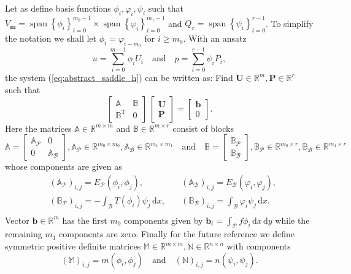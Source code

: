 \documentclass[a4paper,10pt]{article}
\newcommand{\R}{\ensuremath{\mathbb{R}}}
\newcommand{\meas}[1]{\ensuremath{\,\mathrm{d}#1}}
\newcommand{\mm}{\ensuremath{\mathbf{m}}}
\newcommand{\Ep}{\ensuremath{E_{\mathcal{P}}}}
\newcommand{\Eb}{\ensuremath{E_{\mathcal{B}}}}
\newcommand{\Ap}{\ensuremath{\mathbb{A}_{\mathcal{P}}}}
\newcommand{\Ab}{\ensuremath{\mathbb{A}_{\mathcal{B}}}}
\newcommand{\Bp}{\ensuremath{\mathbb{B}_{\mathcal{P}}}}
\newcommand{\Bb}{\ensuremath{\mathbb{B}_{\mathcal{B}}}}
\newcommand{\Amat}{\ensuremath{\mathbb{A}}}
\newcommand{\Bmat}{\ensuremath{\mathbb{B}}}
\newcommand{\Mmat}{\ensuremath{\mathbb{M}}}
\newcommand{\Nmat}{\ensuremath{\mathbb{N}}}
\newcommand{\Apij}[2]{\ensuremath{\left(\mathbb{A}_{\mathcal{P}}\right)_{#1, #2}}}
\newcommand{\Abij}[2]{\ensuremath{\left(\mathbb{A}_{\mathcal{B}}\right)_{#1, #2}}}
\newcommand{\Bpij}[2]{\ensuremath{\left(\mathbb{B}_{\mathcal{P}}\right)_{#1, #2}}}
\newcommand{\Bbij}[2]{\ensuremath{\left(\mathbb{B}_{\mathcal{B}}\right)_{#1, #2}}}
\newcommand{\bvec}{\ensuremath{\mathbf{b}}}
\DeclareMathOperator{\spn}{span}
\begin{document}
  Let as define basis functions $\phi_i, \varphi_i, \psi_i$ such that
  $V_{\mm}=\spn\left\{\phi_i\right\}_{i=0}^{m_0-1} \times
  \spn\left\{\varphi_i\right\}_{i=0}^{m_1-1}$ and $Q_r=\spn\left\{\psi_i\right\}_{i=0}^{r-1}$.
  To simplify the notation we shall let $\phi_i=\varphi_{i-m_0}$ for $i\geq
  m_0$. With an ansatz 
  \[ u=\displaystyle\sum\limits_{i=0}^{m-1}\phi_i U_i
    \quad\text{and}\quad
  p=\displaystyle\sum\limits_{i=0}^{r-1}\psi_i P_i,
  \]
  the system (\ref{eq:abstract_saddle_h}) can be written as: Find
  $\mathbf{U}\in\R^m, \mathbf{P}\in\R^r$ such that
  \begin{equation}
    \label{system}
    \begin{bmatrix}
      \mathbb{A} & \mathbb{B} \\
      \mathbb{B}^{\text{T}} & 0
    \end{bmatrix}
    \,
    \begin{bmatrix}
      \mathbf{U} \\
      \mathbf{P}
    \end{bmatrix}
    =
    \begin{bmatrix}
      \mathbf{b}\\
      0
    \end{bmatrix}.
  \end{equation}
  Here the matrices $\mathbb{A}\in\R^{m\times m}$ and $\mathbb{B}\in\R^{m\times
  r}$ consist of blocks
  \[
    \Amat = 
    \begin{bmatrix}
      \Ap & 0\\
      0 & \Ab
    \end{bmatrix}
    ,\Ap\in\R^{m_0\times m_0}, \Ab\in\R^{m_1\times m_1}
    \quad
    \text{and}
    \quad
    \Bmat = 
    \begin{bmatrix}
      \Bp \\
      \Bb
    \end{bmatrix}
    ,\Bp\in\R^{m_0\times r}, \Bb\in\R^{m_1\times r}
  \]
  whose components are given as
  \[
  \begin{aligned}
    &\Apij{i}{j} = \Ep(\phi_i,
    \phi_j),\quad&\Abij{i}{j}=\Eb(\varphi_i,\varphi_j),\\
    &\Bpij{i}{j} =
    -\int_\mathcal{B}T(\phi_i)\psi_j\meas{x},
    \quad&\Bbij{i}{j}=\int_\mathcal{B}\varphi_i\psi_j\meas{x}.\\
  \end{aligned}
  \]
  Vector $\bvec\in\R^{m}$ has the first $m_0$ components given by
  $\bvec_i=\int_\mathcal{P}f\phi_i\meas{x}\meas{y}$ while the remaining $m_1$
  components are zero. Finally for the future reference we define symmetric
  positive definite matrices $\Mmat\in\R^{m\times m}, \Nmat\in\R^{n\times n}$
  with components
  \[
    \left(\Mmat\right)_{i, j} = m(\phi_i, \phi_j)
    \quad\text{and}\quad
    \left(\Nmat\right)_{i, j} = n(\psi_i, \psi_j).
  \]
\end{document}
